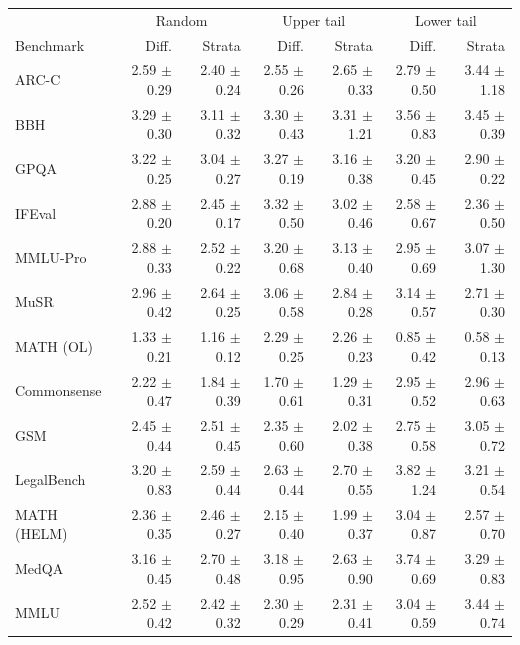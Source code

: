 \begin{tabular}{lrrrrrr}
\toprule
 & \multicolumn{2}{c}{Random} & \multicolumn{2}{c}{Upper tail} & \multicolumn{2}{c}{Lower tail} \\
Benchmark & Diff. & Strata & Diff. & Strata & Diff. & Strata \\
\midrule
ARC-C & 2.59 $\pm$ 0.29 & 2.40 $\pm$ 0.24 & 2.55 $\pm$ 0.26 & 2.65 $\pm$ 0.33 & 2.79 $\pm$ 0.50 & 3.44 $\pm$ 1.18 \\
BBH & 3.29 $\pm$ 0.30 & 3.11 $\pm$ 0.32 & 3.30 $\pm$ 0.43 & 3.31 $\pm$ 1.21 & 3.56 $\pm$ 0.83 & 3.45 $\pm$ 0.39 \\
GPQA & 3.22 $\pm$ 0.25 & 3.04 $\pm$ 0.27 & 3.27 $\pm$ 0.19 & 3.16 $\pm$ 0.38 & 3.20 $\pm$ 0.45 & 2.90 $\pm$ 0.22 \\
IFEval & 2.88 $\pm$ 0.20 & 2.45 $\pm$ 0.17 & 3.32 $\pm$ 0.50 & 3.02 $\pm$ 0.46 & 2.58 $\pm$ 0.67 & 2.36 $\pm$ 0.50 \\
MMLU-Pro & 2.88 $\pm$ 0.33 & 2.52 $\pm$ 0.22 & 3.20 $\pm$ 0.68 & 3.13 $\pm$ 0.40 & 2.95 $\pm$ 0.69 & 3.07 $\pm$ 1.30 \\
MuSR & 2.96 $\pm$ 0.42 & 2.64 $\pm$ 0.25 & 3.06 $\pm$ 0.58 & 2.84 $\pm$ 0.28 & 3.14 $\pm$ 0.57 & 2.71 $\pm$ 0.30 \\
MATH (OL) & 1.33 $\pm$ 0.21 & 1.16 $\pm$ 0.12 & 2.29 $\pm$ 0.25 & 2.26 $\pm$ 0.23 & 0.85 $\pm$ 0.42 & 0.58 $\pm$ 0.13 \\
Commonsense & 2.22 $\pm$ 0.47 & 1.84 $\pm$ 0.39 & 1.70 $\pm$ 0.61 & 1.29 $\pm$ 0.31 & 2.95 $\pm$ 0.52 & 2.96 $\pm$ 0.63 \\
GSM & 2.45 $\pm$ 0.44 & 2.51 $\pm$ 0.45 & 2.35 $\pm$ 0.60 & 2.02 $\pm$ 0.38 & 2.75 $\pm$ 0.58 & 3.05 $\pm$ 0.72 \\
LegalBench & 3.20 $\pm$ 0.83 & 2.59 $\pm$ 0.44 & 2.63 $\pm$ 0.44 & 2.70 $\pm$ 0.55 & 3.82 $\pm$ 1.24 & 3.21 $\pm$ 0.54 \\
MATH (HELM) & 2.36 $\pm$ 0.35 & 2.46 $\pm$ 0.27 & 2.15 $\pm$ 0.40 & 1.99 $\pm$ 0.37 & 3.04 $\pm$ 0.87 & 2.57 $\pm$ 0.70 \\
MedQA & 3.16 $\pm$ 0.45 & 2.70 $\pm$ 0.48 & 3.18 $\pm$ 0.95 & 2.63 $\pm$ 0.90 & 3.74 $\pm$ 0.69 & 3.29 $\pm$ 0.83 \\
MMLU & 2.52 $\pm$ 0.42 & 2.42 $\pm$ 0.32 & 2.30 $\pm$ 0.29 & 2.31 $\pm$ 0.41 & 3.04 $\pm$ 0.59 & 3.44 $\pm$ 0.74 \\
\bottomrule
\end{tabular}